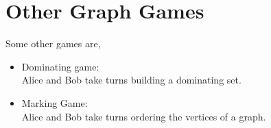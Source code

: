 \documentclass{beamer}
\begin{document}
\section{Other Graph Games}


\begin{frame}{\secname}
    
    Some other games are,
    \begin{itemize}
        \item Dominating game: \\
        Alice and Bob take turns building a dominating set.
        \pause
        \pause
        \item Marking Game: \\
        Alice and Bob take turns ordering the vertices of a graph.
        \pause
    \end{itemize}
    
\end{frame}
\end{document}

